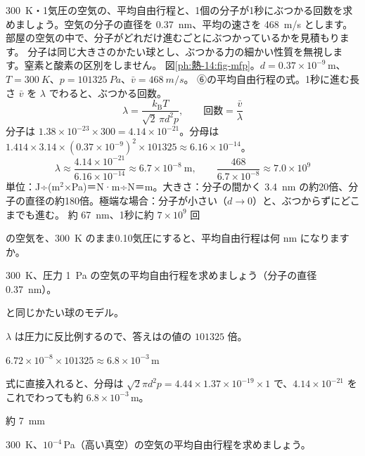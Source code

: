 \begin{phreidai}[空気の分子の平均自由行程]
\label{ph:熱-14:ex6}\qty{300}{K}・1気圧の空気の、平均自由行程と、1個の分子が1秒にぶつかる回数を求めましょう。空気の分子の直径を \qty{0.37}{nm}、平均の速さを \qty{468}{m/s} とします。
\phbamen
部屋の空気の中で、分子がどれだけ進むごとにぶつかっているかを見積もります。
\phmushi
分子は同じ大きさのかたい球とし、ぶつかる力の細かい性質を無視します。窒素と酸素の区別をしません。
\phzu
図\ref{ph:熱-14:fig-mfp}。$d=0.37\times10^{-9}$\,m、$T=\qty{300}{K}$、$p=\qty{101325}{Pa}$、$\bar v=\qty{468}{m/s}$。
\phriyu
⑥の平均自由行程の式。1秒に進む長さ $\bar v$ を $\lambda$ でわると、ぶつかる回数。
\phtateru
\[ \lambda=\frac{k_{\mathrm B}T}{\sqrt2\,\pi d^2p},\qquad \text{回数}=\frac{\bar v}{\lambda} \]
\phtoku
分子は $1.38\times10^{-23}\times300=4.14\times10^{-21}$。分母は $1.414\times3.14\times(0.37\times10^{-9})^2\times\num{101325}\approx6.16\times10^{-14}$。
\[ \lambda\approx\frac{4.14\times10^{-21}}{6.16\times10^{-14}}\approx6.7\times10^{-8}\ \mathrm{m},\qquad \frac{468}{6.7\times10^{-8}}\approx7.0\times10^9 \]
\phtashikame
単位：J÷(m$^2$×Pa)＝N·m÷N＝m。大きさ：分子の間かく \qty{3.4}{nm} の約20倍、分子の直径の約180倍。極端な場合：分子が小さい（$d\to0$）と、ぶつからずにどこまでも進む。
\kotae 約 \qty{67}{nm}、1秒に約 $7\times10^9$ 回
\end{phreidai}
\begin{jibun}
の空気を、\qty{300}{K} のまま0.10気圧にすると、平均自由行程は何 nm になりますか。
\end{jibun}

\begin{reidai}[真空の中の平均自由行程]
\label{ph:熱-14:ex7}\qty{300}{K}、圧力 \qty{1}{Pa} の空気の平均自由行程を求めましょう（分子の直径 \qty{0.37}{nm}）。
\par{} と同じかたい球のモデル。
\par\kangaekata $\lambda$ は圧力に反比例するので、答えはの値の $\num{101325}$ 倍。
\par\shiki $6.72\times10^{-8}\times\num{101325}\approx6.8\times10^{-3}$\,m
\par{} 式に直接入れると、分母は $\sqrt2\pi d^2p=4.44\times1.37\times10^{-19}\times1$ で、$4.14\times10^{-21}$ をこれでわっても約 $6.8\times10^{-3}$\,m。
\par\kotae 約 \qty{7}{mm}
\end{reidai}
\begin{jibun}
\qty{300}{K}、$10^{-4}$\,Pa（高い真空）の空気の平均自由行程を求めましょう。
\end{jibun}

